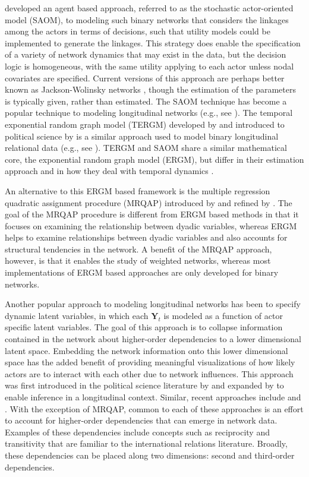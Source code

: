 \documentclass[3p,times,twocolumn,authoryear,12pt]{elsarticle}
\newcommand{\bl}[1]{{\mathbf #1}}
\begin{document}
\citet{snijders:2001} developed an agent based approach, referred to as the stochastic actor-oriented model (SAOM), to modeling such binary networks that considers the linkages among the actors in terms of decisions, such that utility models could be implemented to generate the linkages. This strategy does enable the specification of a variety of network dynamics that may exist in the data, but the decision logic is homogeneous, with the same utility applying to each actor unless nodal covariates are specified. Current versions of this approach are perhaps better known as Jackson-Wolinsky networks \citep{jackson:wolinsky:1996}, though the estimation of the parameters is typically given, rather than estimated. The SAOM technique has become a popular technique to modeling longitudinal networks (e.g., see \citealp{manger:etal:2012, kinne:2013, berardo:2013}). The temporal exponential random graph model (TERGM) developed by \citet{hanneke:xing:2007} and introduced to political science by \citet{cranmer:desmarais:2011} is a similar approach used to model binary longitudinal relational data (e.g., see \citealp{cranmer:desmarais:etal:2012, corbetta2013}). TERGM and SAOM share a similar mathematical core, the exponential random graph model (ERGM), but differ in their estimation approach and in how they deal with temporal dynamics \citep{leifeld:cranmer:2015}. 

An alternative to this ERGM based framework is the multiple regression quadratic assignment procedure (MRQAP) introduced by \citet{krackhardt:1988} and refined by \citet{dekker:etal:2007}. The goal of the MRQAP procedure is different from ERGM based methods in that it focuses on examining the relationship between dyadic variables, whereas ERGM helps to examine relationships between dyadic variables and also accounts for structural tendencies in the network. A benefit of the MRQAP approach, however, is that it enables the study of weighted networks, whereas most implementations of ERGM based approaches are only developed for binary networks. 

Another popular approach to modeling longitudinal networks has been to specify dynamic latent variables, in which each $\bl Y_t$ is modeled as a function of actor specific latent variables. The goal of this approach is to collapse information contained in the network about higher-order dependencies to a lower dimensional latent space. Embedding the network information onto this lower dimensional space has the added benefit of providing meaningful visualizations of how likely actors are to interact with each other due to network influences. This approach was first introduced in the political science literature by \citet{ward:hoff:2007} and expanded by \citet{ward:ahlquist:etal:2012} to enable inference in a longitudinal context. Similar, recent approaches include \citet{durante:dunson:2014} and \citet{sewell:chen:2014}. With the exception of MRQAP, common to each of these approaches is an effort to account for higher-order dependencies that can emerge in network data. Examples of these dependencies include concepts such as reciprocity and transitivity that are familiar to the international relations literature. Broadly, these dependencies can be placed along two dimensions: second and third-order dependencies. 
\end{document}
